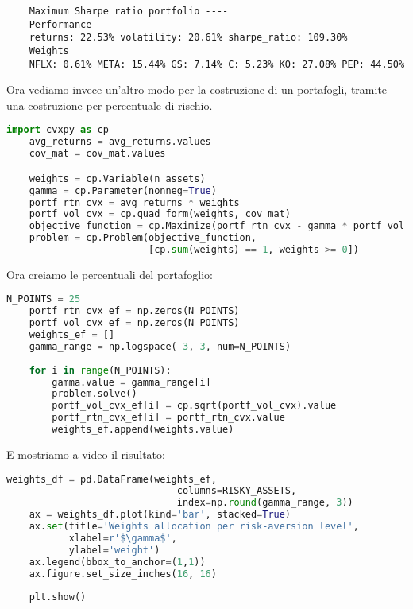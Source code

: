 \documentclass{report}
\begin{document}
\begin{lstlisting}
    Maximum Sharpe ratio portfolio ----
    Performance
    returns: 22.53% volatility: 20.61% sharpe_ratio: 109.30% 
    Weights
    NFLX: 0.61% META: 15.44% GS: 7.14% C: 5.23% KO: 27.08% PEP: 44.50% 
\end{lstlisting}

Ora vediamo invece un'altro modo per la costruzione di un portafogli, tramite una costruzione per percentuale di rischio.

\begin{lstlisting}[language=python]
    import cvxpy as cp
    avg_returns = avg_returns.values
    cov_mat = cov_mat.values

    weights = cp.Variable(n_assets)
    gamma = cp.Parameter(nonneg=True)
    portf_rtn_cvx = avg_returns * weights 
    portf_vol_cvx = cp.quad_form(weights, cov_mat)
    objective_function = cp.Maximize(portf_rtn_cvx - gamma * portf_vol_cvx)
    problem = cp.Problem(objective_function, 
                         [cp.sum(weights) == 1, weights >= 0])
\end{lstlisting}

Ora creiamo le percentuali del portafoglio:

\begin{lstlisting}[language=python]
    N_POINTS = 25
    portf_rtn_cvx_ef = np.zeros(N_POINTS)
    portf_vol_cvx_ef = np.zeros(N_POINTS)
    weights_ef = []
    gamma_range = np.logspace(-3, 3, num=N_POINTS)
    
    for i in range(N_POINTS):
        gamma.value = gamma_range[i]
        problem.solve()
        portf_vol_cvx_ef[i] = cp.sqrt(portf_vol_cvx).value
        portf_rtn_cvx_ef[i] = portf_rtn_cvx.value
        weights_ef.append(weights.value)
\end{lstlisting}

E mostriamo a video il risultato:
\begin{lstlisting}[language=python]
    weights_df = pd.DataFrame(weights_ef, 
                              columns=RISKY_ASSETS, 
                              index=np.round(gamma_range, 3))
    ax = weights_df.plot(kind='bar', stacked=True) 
    ax.set(title='Weights allocation per risk-aversion level',
           xlabel=r'$\gamma$', 
           ylabel='weight')
    ax.legend(bbox_to_anchor=(1,1))
    ax.figure.set_size_inches(16, 16)
    
    plt.show()
\end{lstlisting}
\end{document}
